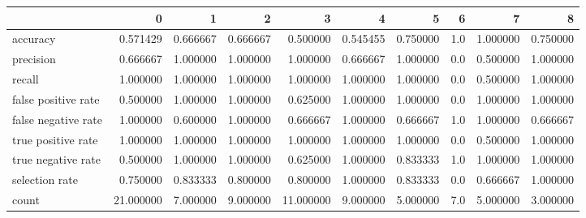 \begin{tabular}{lrrrrrrrrr}
\toprule
{} &          0 &         1 &         2 &          3 &         4 &         5 &    6 &         7 &         8 \\
\midrule
accuracy            &   0.571429 &  0.666667 &  0.666667 &   0.500000 &  0.545455 &  0.750000 &  1.0 &  1.000000 &  0.750000 \\
precision           &   0.666667 &  1.000000 &  1.000000 &   1.000000 &  0.666667 &  1.000000 &  0.0 &  0.500000 &  1.000000 \\
recall              &   1.000000 &  1.000000 &  1.000000 &   1.000000 &  1.000000 &  1.000000 &  0.0 &  0.500000 &  1.000000 \\
false positive rate &   0.500000 &  1.000000 &  1.000000 &   0.625000 &  1.000000 &  1.000000 &  0.0 &  1.000000 &  1.000000 \\
false negative rate &   1.000000 &  0.600000 &  1.000000 &   0.666667 &  1.000000 &  0.666667 &  1.0 &  1.000000 &  0.666667 \\
true positive rate  &   1.000000 &  1.000000 &  1.000000 &   1.000000 &  1.000000 &  1.000000 &  0.0 &  0.500000 &  1.000000 \\
true negative rate  &   0.500000 &  1.000000 &  1.000000 &   0.625000 &  1.000000 &  0.833333 &  1.0 &  1.000000 &  1.000000 \\
selection rate      &   0.750000 &  0.833333 &  0.800000 &   0.800000 &  1.000000 &  0.833333 &  0.0 &  0.666667 &  1.000000 \\
count               &  21.000000 &  7.000000 &  9.000000 &  11.000000 &  9.000000 &  5.000000 &  7.0 &  5.000000 &  3.000000 \\
\bottomrule
\end{tabular}
